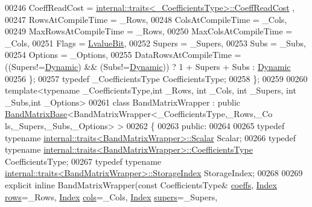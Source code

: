 \begin{DoxyCode}
00246     CoeffReadCost = \hyperlink{struct_eigen_1_1internal_1_1traits}{internal::traits<\_CoefficientsType>::CoeffReadCost}
      ,
00247     RowsAtCompileTime = \_Rows,
00248     ColsAtCompileTime = \_Cols,
00249     MaxRowsAtCompileTime = \_Rows,
00250     MaxColsAtCompileTime = \_Cols,
00251     Flags = \hyperlink{group__flags_gae2c323957f20dfdc6cb8f44428eaec1a}{LvalueBit},
00252     Supers = \_Supers,
00253     Subs = \_Subs,
00254     Options = \_Options,
00255     DataRowsAtCompileTime = ((Supers!=\hyperlink{namespace_eigen_ad81fa7195215a0ce30017dfac309f0b2}{Dynamic}) && (Subs!=\hyperlink{namespace_eigen_ad81fa7195215a0ce30017dfac309f0b2}{Dynamic})) ? 1 + Supers + Subs : 
      \hyperlink{namespace_eigen_ad81fa7195215a0ce30017dfac309f0b2}{Dynamic}
00256   \};
00257   \textcolor{keyword}{typedef} \_CoefficientsType CoefficientsType;
00258 \};
00259 
00260 \textcolor{keyword}{template}<\textcolor{keyword}{typename} \_CoefficientsType,\textcolor{keywordtype}{int} \_Rows, \textcolor{keywordtype}{int} \_Cols, \textcolor{keywordtype}{int} \_Supers, \textcolor{keywordtype}{int} \_Subs,\textcolor{keywordtype}{int} \_Options>
00261 \textcolor{keyword}{class }BandMatrixWrapper : \textcolor{keyword}{public} \hyperlink{class_eigen_1_1internal_1_1_band_matrix_base}{BandMatrixBase}<BandMatrixWrapper<\_CoefficientsType,\_Rows,\_Co
      ls,\_Supers,\_Subs,\_Options> >
00262 \{
00263   \textcolor{keyword}{public}:
00264 
00265     \textcolor{keyword}{typedef} \textcolor{keyword}{typename} \hyperlink{struct_eigen_1_1internal_1_1traits}{internal::traits<BandMatrixWrapper>::Scalar}
       Scalar;
00266     \textcolor{keyword}{typedef} \textcolor{keyword}{typename} \hyperlink{struct_eigen_1_1internal_1_1traits}{internal::traits<BandMatrixWrapper>::CoefficientsType}
       CoefficientsType;
00267     \textcolor{keyword}{typedef} \textcolor{keyword}{typename} \hyperlink{struct_eigen_1_1internal_1_1traits}{internal::traits<BandMatrixWrapper>::StorageIndex}
       StorageIndex;
00268 
00269     \textcolor{keyword}{explicit} \textcolor{keyword}{inline} BandMatrixWrapper(\textcolor{keyword}{const} CoefficientsType& \hyperlink{class_eigen_1_1internal_1_1_band_matrix_base_ab7c9e9a7ca5ad0f2f3a82ac582650499}{coeffs}, 
      \hyperlink{group___core___module_a554f30542cc2316add4b1ea0a492ff02}{Index} \hyperlink{group___core___module_a8141320ba8df384426c298b32b000d8e}{rows}=\_Rows, \hyperlink{group___core___module_a554f30542cc2316add4b1ea0a492ff02}{Index} \hyperlink{group___core___module_a7b0b45c7351847696c911ce8aa2abbdb}{cols}=\_Cols, \hyperlink{group___core___module_a554f30542cc2316add4b1ea0a492ff02}{Index} \hyperlink{class_eigen_1_1internal_1_1_band_matrix_base_a58617da0d75d22b1f8dfdfde702ebb4a}{supers}=\_Supers, 

\end{DoxyCode}
